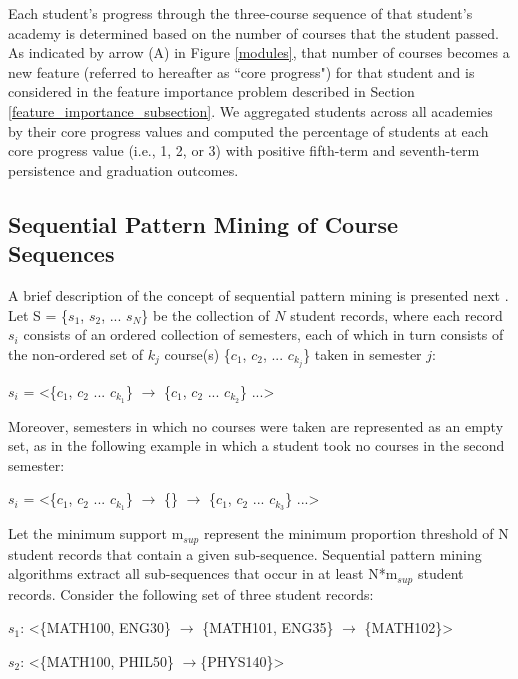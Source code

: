 \documentclass[conference]{IEEEtran}
\begin{document}
Each student's progress through the three-course sequence of that student's academy is determined based on the number of courses that the student passed.  As indicated by arrow (A) in Figure \ref{modules}, that number of courses becomes a new feature (referred to hereafter as ``core progress") for that student and is considered in the feature importance problem described in Section \ref{feature_importance_subsection}.  We aggregated students across all academies by their core progress values and computed the percentage of students at each core progress value (i.e., 1, 2, or 3) with positive fifth-term and seventh-term persistence and graduation outcomes.  

\subsection{Sequential Pattern Mining of Course Sequences}

A brief description of the concept of sequential pattern mining is presented next \cite{Pei}.  %
 Let S = \{$s_1$, $s_2$, ... $s_N$\} be the collection of $N$ student records, where each record $s_i$ consists of an ordered collection of semesters, each of which in turn consists of the non-ordered set of $k_j$ course(s) \{$c_1$, $c_2$, ... $c_{k_j}$\}  taken in semester $j$: 

$s_i$ = \textless\{$c_1$, $c_2$ ... $c_{k_1}$\}  $\rightarrow$ \{$c_1$, $c_2$ ... $c_{k_2}$\} ...\textgreater

Moreover, semesters in which no courses were taken are represented as an empty set, as in the following example in which a student took no courses in the second semester:

$s_i$ = \textless\{$c_1$, $c_2$ ... $c_{k_1}$\} $\rightarrow$ \{\} $\rightarrow$ \{$c_1$, $c_2$ ... $c_{k_3}$\} ...\textgreater

Let the minimum support m$_{sup}$ represent the minimum proportion threshold of N student records that contain a given sub-sequence.  Sequential pattern mining algorithms extract all sub-sequences that occur in at least N*m$_{sup}$ student records.  Consider the following set of three student records:

$s_1$: \textless\{MATH100, ENG30\} $\rightarrow$ \{MATH101, ENG35\} $\rightarrow$ \{MATH102\}\textgreater

$s_2$: \textless\{MATH100, PHIL50\} $\rightarrow$\{PHYS140\}\textgreater
\end{document}

